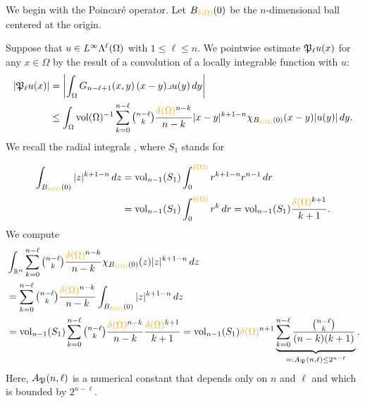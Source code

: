 \documentclass[10pt,letterpaper]{article}
\newcommand\cye[1]{%
  \protect\leavevmode
  \begingroup
    \color{red!35!yellow}%
    #1%
  \endgroup
}
\begin{document}
We begin with the Poincar\'e operator. \cye{Let $B_{\cye{\diam(\Omega)}}(0)$ be the $n$-dimensional ball centered at the origin.}
Suppose that $u \in L^{\infty}\Lambda^{\ell}(\Omega)$ with $1 \leq \ell \leq n$.
We pointwise estimate ${\mathfrak P}_{\ell} u(x)$ for any $x \in \Omega$ by the result of a convolution of a locally integrable function with $u$:
\begin{align*}
    \left| \Poinc_{\ell} u(x) \right|
    &=
    \left| 
        \int_{\Omega} G_{n-\ell+1}(x,y) \,(x-y)\lrcorner u(y)\,dy
    \right| 
    \\&\leq 
    \int_{\Omega} \vol(\Omega)^{-1} \sum_{k=0}^{ n-\ell }\tbinom{ n-\ell }{k} \frac{ \cye{\diam(\Omega)}^{n-k} }{n-k} |x-y|^{k+1-n} \chi_{B_{\cye{\diam(\Omega)}}(0)}(x-y) |u(y)| \,dy
    .
\end{align*}
We recall the radial integrals\cye{, where $S_1$ stands for}
\begin{align*}
    \int_{B_{\cye{\diam(\Omega)}}(0)} |z|^{k+1-n} \,dz
    &
    =
    \vol_{n-1}(S_1) \int_{0}^{\cye{\diam(\Omega)}} r^{k+1-n} r^{n-1} \,dr
    \\&
    =
    \vol_{n-1}(S_1) \int_{0}^{\cye{\diam(\Omega)}} r^{k} \,dr
    =
    \vol_{n-1}(S_1) \frac{\cye{\diam(\Omega)}^{k+1}}{k+1}
    .
\end{align*}
We compute 
\begin{align}
    &
    \int_{\bbR^{n}} \sum_{k=0}^{n-\ell} \tbinom{n-\ell}{k} \frac{ \cye{\diam(\Omega)}^{n-k} }{n-k} \chi_{B_{\cye{\diam(\Omega)}}(0)}(z) |z|^{k+1-n} \,dz
    \nonumber \\&
    =
    \sum_{k=0}^{n-\ell} \tbinom{n-\ell}{k} \frac{ \cye{\diam(\Omega)}^{n-k} }{n-k} \int_{B_{\cye{\diam(\Omega)}}(0)} |z|^{k+1-n} \,dz
    \nonumber \\&
    =
    \vol_{n-1}(S_1) \sum_{k=0}^{n-\ell} \tbinom{n-\ell}{k} \frac{ \cye{\diam(\Omega)}^{n-k} }{n-k} \frac{\cye{\diam(\Omega)}^{k+1}}{k+1}
    =
    \vol_{n-1}(S_1) \cye{\diam(\Omega)}^{n+1} \underbrace{ \sum_{k=0}^{n-\ell} \frac{ \tbinom{n-\ell}{k} }{ (n-k)(k+1) } }_{ =: A_{\Poinc}(n,\ell) \leq 2^{n-\ell}} \label{equation:A_Poinc}
    .
\end{align}
Here, $A_{{\mathfrak P}}(n,\ell)$ is a numerical constant that depends only on $n$ and $\ell$ 
and which is bounded by $2^{n-\ell}$. 
\end{document}
